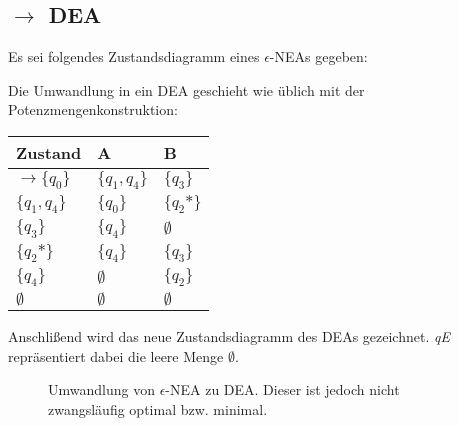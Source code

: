 \documentclass[12pt, oneside]{book}
\begin{document}
\subsection[Epsilon-NEA zu DEA]{\enea $\to$ DEA}
Es sei folgendes Zustandsdiagramm eines $\epsilon$-NEAs gegeben:\par
\begin{figure}[H]
    \centering
    \begin{transitiongraph}[fa]
    \end{transitiongraph}
    \label{graph:epsNEA}
\end{figure}
Die Umwandlung in ein DEA geschieht wie üblich mit der Potenzmengenkonstruktion:
\begin{table}[H]
\centering
\begin{tabular}{|l|l|l|}
\hline
Zustand         & A           & B               \\ \hline
$\to \{q_0\}$       & $\{q_1,q_4\}$ & $\{q_3\}$           \\ \hline
$\{q_1,q_4\}$     & $\{q_0\}$     & $\{q_2\mbox{*}\}$ \\ \hline
$\{q_3\}$         & $\{q_4\}$     & $\emptyset$     \\ \hline
$\{q_2\mbox{*}\}$ & $\{q_4\}$     & $\{q_3\}$         \\ \hline
$\{q_4\}$         & $\emptyset$ & $\{q_2\}$           \\ \hline
$\emptyset$     & $\emptyset$ & $\emptyset$     \\ \hline
\end{tabular}
\end{table}
Anschlißend wird das neue Zustandsdiagramm des DEAs gezeichnet. \textit{qE} repräsentiert dabei die leere Menge $\emptyset$.\par
\begin{figure}[H]
    \centering
    \begin{transitiongraph}[fa]
    \end{transitiongraph}
    \caption{Umwandlung von $\epsilon$-NEA zu DEA. Dieser ist jedoch nicht zwangsläufig optimal bzw. minimal.}
\end{figure}
\newpage
\end{document}
